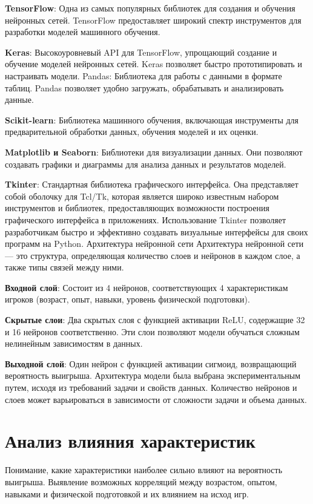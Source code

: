 \documentclass[12pt,a4paper]{article}
\begin{document}
\item \textbf{TensorFlow}: Одна из самых популярных библиотек для создания и обучения нейронных сетей. TensorFlow предоставляет широкий спектр инструментов для разработки моделей машинного обучения.
\item \textbf{Keras}: Высокоуровневый API для TensorFlow, упрощающий создание и обучение моделей нейронных сетей. Keras позволяет быстро прототипировать и настраивать модели.
Pandas: Библиотека для работы с данными в формате таблиц. Pandas позволяет удобно загружать, обрабатывать и анализировать данные.
\item \textbf{Scikit-learn}: Библиотека машинного обучения, включающая инструменты для предварительной обработки данных, обучения моделей и их оценки.
\item \textbf{Matplotlib и Seaborn}: Библиотеки для визуализации данных. Они позволяют создавать графики и диаграммы для анализа данных и результатов моделей.
\item \textbf{Tkinter}: Стандартная библиотека графического интерфейса. Она представляет собой оболочку для Tcl/Tk, которая является широко известным набором инструментов и библиотек, предоставляющих возможности построения графического интерфейса в приложениях. Использование Tkinter позволяет разработчикам быстро и эффективно создавать визуальные интерфейсы для своих программ на Python.
Архитектура нейронной сети
Архитектура нейронной сети — это структура, определяющая количество слоев и нейронов в каждом слое, а также типы связей между ними.
\item \textbf{Входной слой}: Состоит из 4 нейронов, соответствующих 4 характеристикам игроков (возраст, опыт, навыки, уровень физической подготовки).
\item \textbf{Скрытые слои}: Два скрытых слоя с функцией активации ReLU, содержащие 32 и 16 нейронов соответственно. Эти слои позволяют модели обучаться сложным нелинейным зависимостям в данных.
\item \textbf{Выходной слой}: Один нейрон с функцией активации сигмоид, возвращающий вероятность выигрыша.
Архитектура модели была выбрана экспериментальным путем, исходя из требований задачи и свойств данных. Количество нейронов и слоев может варьироваться в зависимости от сложности задачи и объема данных.

\section{Анализ влияния характеристик}
Понимание, какие характеристики наиболее сильно влияют на вероятность выигрыша. Выявление возможных корреляций между возрастом, опытом, навыками и физической подготовкой и их влиянием на исход игр.
\end{document}
